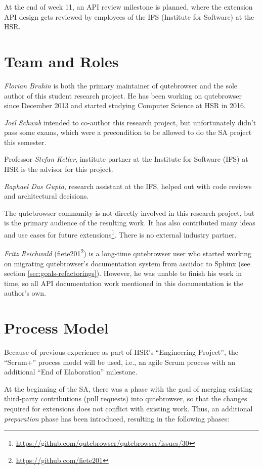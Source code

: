 At the end of week 11, an API review milestone is planned, where the extension
API design gets reviewed by employees of the IFS (Institute for Software) at the
HSR.

\section{Team and Roles}
\emph{Florian Bruhin} is both the primary maintainer of qutebrowser and the
sole author of this student research project. He has been working on qutebrowser since
December 2013 and started studying Computer Science at HSR in 2016.

\emph{Joël Schwab} intended to co-author this research project, but
unfortunately didn't pass some exams, which were a precondition to be allowed to
do the SA project this semester.

Professor \emph{Stefan Keller}, institute partner at the Institute for Software
(IFS) at HSR is the advisor for this project.

\emph{Raphael Das Gupta}, research assistant at the IFS, helped out with code
reviews and architectural decisions.

The qutebrowser community is not directly involved in this research project, but
is the primary audience of the resulting work. It has also contributed many
ideas and use cases for future
extensions\footnote{\url{https://github.com/qutebrowser/qutebrowser/issues/30}}.
There is no external industry partner.

\label{fiete}
\emph{Fritz Reichwald} (fiete201\footnote{\url{https://github.com/fiete201}})
is a long-time qutebrowser user who started working on migrating qutebrowser's
documentation system from asciidoc to Sphinx (see section
\ref{sec:goals-refactorings}). However, he was unable to finish his work in
time, so all API documentation work mentioned in this documentation is the
author's own.

\section{Process Model}
Because of previous experience as part of HSR's ``Engineering Project'', the
``Scrum+'' process model will be used, i.e., an agile Scrum process with an
additional ``End of Elaboration'' milestone.

At the beginning of the SA, there was a phase with the goal of merging existing
third-party contributions (pull requests) into qutebrowser, so that the changes
required for extensions does not conflict with existing work. Thus, an additional
\emph{preparation} phase has been introduced, resulting in the following phases:

